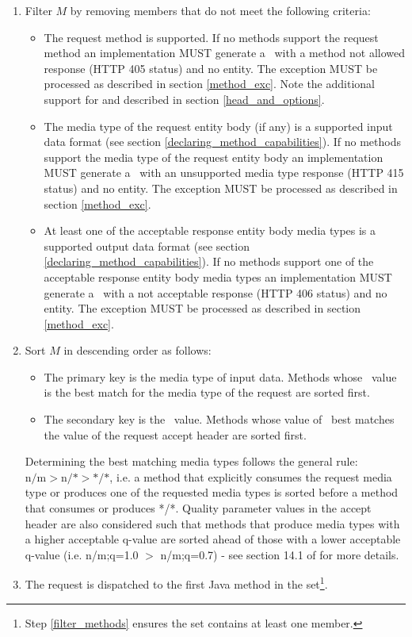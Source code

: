 \begin{enumerate}
\begin{enumerate}
\item \label{filter_methods} Filter $M$ by removing members that do not meet the following criteria:
\begin{itemize}
\item The request method is supported. If no methods support the request method an implementation MUST generate a \WebAppExc\ with a method not allowed response (HTTP 405 status) and no entity. The exception MUST be processed as described in section \ref{method_exc}. Note the additional support for  and  described in section \ref{head_and_options}.
\item The media type of the request entity body (if any) is a supported input data format (see section \ref{declaring_method_capabilities}). If no methods support the media type of the request entity body an implementation MUST generate a \WebAppExc\ with an unsupported media type response (HTTP 415 status) and no entity. The exception MUST be processed as described in section \ref{method_exc}.
\item At least one of the acceptable response entity body media types is a supported output data format (see section \ref{declaring_method_capabilities}). If no methods support one of the acceptable response entity body media types an implementation MUST generate a \WebAppExc\ with a not acceptable response (HTTP 406 status) and no entity. The exception MUST be processed as described in section \ref{method_exc}.
\end{itemize} 
\item Sort $M$ in descending order as follows:
\begin{itemize}
\item The primary key is the media type of input data. Methods whose \Consumes\ value is the best match for the media type of the request are sorted first.
\item The secondary key is the \Produces\ value. Methods whose value of \Produces\ best matches the value of the request accept header are sorted first.
\end{itemize}

Determining the best matching media types follows the general rule: $\mbox{n/m} > \mbox{n/*} > \mbox{*/*}$, i.e. a method that explicitly consumes the request media type or produces one of the requested media types is sorted before a method that consumes or produces */*. Quality parameter values in the accept header are also considered such that methods that produce media types with a higher acceptable q-value are sorted ahead of those with a lower acceptable q-value (i.e. n/m;q=1.0 $>$ n/m;q=0.7) - see section 14.1 of \cite{http11} for more details.

\item \label{dispatch_method} The request is dispatched to the first Java method in the set\footnote{Step \ref{filter_methods} ensures the set contains at least one member.}.
\end{enumerate}

\end{enumerate}


